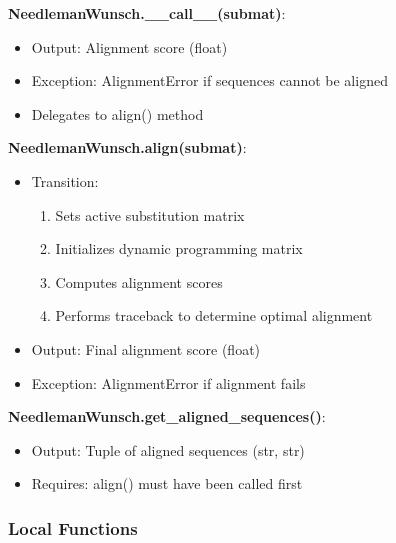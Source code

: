 \documentclass[12pt, titlepage]{article}
\begin{document}
\noindent \textbf{NeedlemanWunsch.\_\_call\_\_(submat)}:
\begin{itemize}
    \item Output: Alignment score (float)
    \item Exception: AlignmentError if sequences cannot be aligned
    \item Delegates to align() method
\end{itemize}

\noindent \textbf{NeedlemanWunsch.align(submat)}:
\begin{itemize}
    \item Transition: 
    \begin{enumerate}
        \item Sets active substitution matrix
        \item Initializes dynamic programming matrix
        \item Computes alignment scores
        \item Performs traceback to determine optimal alignment
    \end{enumerate}
    \item Output: Final alignment score (float)
    \item Exception: AlignmentError if alignment fails
\end{itemize}

\noindent \textbf{NeedlemanWunsch.get\_aligned\_sequences()}:
\begin{itemize}
    \item Output: Tuple of aligned sequences (str, str)
    \item Requires: align() must have been called first
\end{itemize}

\subsubsection{Local Functions}
\end{document}
